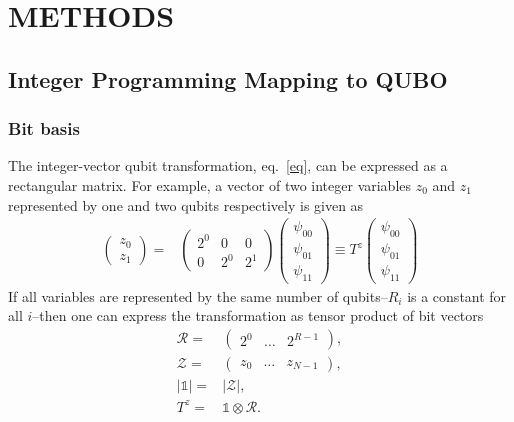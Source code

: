 \documentclass[prd,twocolumn,tightenlines,preprintnumbers,showpacs,superscriptaddress,notitlepage,nofootinbib,eqsecnum,floatfix,longbibliography,aps,10pt]{revtex4-2}
\begin{document}




\section{METHODS}
\label{sec:methods}

\subsection{Integer Programming Mapping to QUBO}
\label{sec:methods:ilp}

\subsubsection{Bit basis}
\label{sec:methods:bit-basis}

The integer-vector qubit transformation, eq.~\eqref{eq}, can be expressed as a rectangular matrix.
For example, a vector of two integer variables $z_0$ and $z_1$ represented by one and two qubits respectively is given as
\begin{align}
 \begin{pmatrix}
  z_0 \\
  z_1
 \end{pmatrix}
 = &
 \begin{pmatrix}
  2^0 & 0   & 0   \\
  0   & 2^0 & 2^1
 \end{pmatrix}
 \begin{pmatrix}
  \psi_{00} \\
  \psi_{01} \\
  \psi_{11}
 \end{pmatrix}
 \equiv T^z \begin{pmatrix}
  \psi_{00} \\
  \psi_{01} \\
  \psi_{11}
 \end{pmatrix}
\end{align}
If all variables are represented by the same number of qubits--$R_i$ is a constant for all $i$--then one can express the transformation as tensor product of bit vectors
\begin{align}
 \mathcal{R} =  & \begin{pmatrix} 2^0 & \dots & 2^{R-1}\end{pmatrix},    \\
 \mathcal{Z} =  & \begin{pmatrix} z_0 & \dots & z_{N-1}\end{pmatrix},    \\
 |\mathds{1}| = & |\mathcal{Z}|,                 \\
 T^z =          & \mathds{1}\otimes \mathcal{R}.
\end{align}
\end{document}
